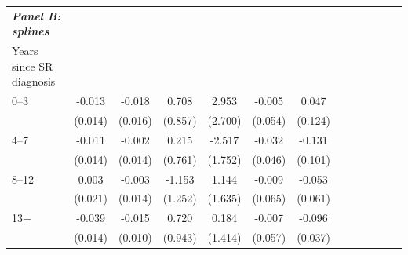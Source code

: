 \documentclass[12pt,english]{article}
\providecommand{\DIFdelendFL}{} %
\begin{document}
\begin{table}[!ht]
\begin{center}
\begin{adjustbox}{max width=.9\linewidth}
\begin{threeparttable}
{\begin{tabular}{l*{6}{S S}}
\DIFdelendFL \textit{\textbf{Panel B: splines}} &&&&&&\\
						Years since SR diagnosis  &&&&&&\\
0--3 &    -0.013         &   -0.018         &    0.708         &    2.953         &   -0.005         &    0.047         \\
						&  (0.014)         &  (0.016)         &  (0.857)         &  (2.700)         &  (0.054)         &  (0.124)         \\
						4--7 &    -0.011         &   -0.002         &    0.215         &   -2.517         &   -0.032         &   -0.131         \\
						&  (0.014)         &  (0.014)         &  (0.761)         &  (1.752)         &  (0.046)         &  (0.101)         \\
						8--12 &    0.003         &   -0.003         &   -1.153         &    1.144         &   -0.009         &   -0.053         \\
						&  (0.021)         &  (0.014)         &  (1.252)         &  (1.635)         &  (0.065)         &  (0.061)         \\
						13+ &    -0.039\sym{***}&   -0.015         &    0.720         &    0.184         &   -0.007         &   -0.096\sym{***}\\
						&  (0.014)         &  (0.010)         &  (0.943)         &  (1.414)         &  (0.057)         &  (0.037)         \\
				


\end{tabular}}
\end{threeparttable}
\end{adjustbox}
\end{center}
\end{table}
\end{document}
